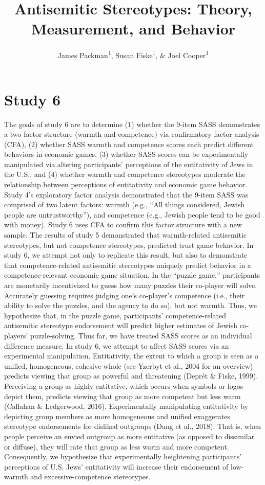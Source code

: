 \documentclass[
  doc,draftall]{apa6}
\title{Antisemitic Stereotypes: Theory, Measurement, and Behavior}
\author{James Packman\textsuperscript{1}, Susan Fiske\textsuperscript{1}, \& Joel Cooper\textsuperscript{1}}
\date{}
\affiliation{\vspace{0.5cm}\textsuperscript{1} Princeton University}
\begin{document}
\maketitle

\section{Study 6}\label{study-6}

The goals of study 6 are to determine (1) whether the 9-item SASS demonstrates a two-factor structure (warmth and competence) via confirmatory factor analysis (CFA), (2) whether SASS warmth and competence scores each predict different behaviors in economic games, (3) whether SASS scores can be experimentally manipulated via altering participants' perceptions of the entitativity of Jews in the U.S., and (4) whether warmth and competence stereotypes moderate the relationship between perceptions of entitativity and economic game behavior.
Study 4's exploratory factor analysis demonstrated that the 9-item SASS was comprised of two latent factors: warmth (e.g., ``All things considered, Jewish people are untrustworthy''), and competence (e.g., Jewish people tend to be good with money). Study 6 uses CFA to confirm this factor structure with a new sample.
The results of study 5 demonstrated that warmth-related antisemitic stereotypes, but not competence stereotypes, predicted trust game behavior. In study 6, we attempt not only to replicate this result, but also to demonstrate that competence-related antisemitic stereotypes uniquely predict behavior in a competence-relevant economic game situation. In the ``puzzle game,'' participants are monetarily incentivized to guess how many puzzles their co-player will solve. Accurately guessing requires judging one's co-player's competence (i.e., their ability to solve the puzzles, and the agency to do so), but not warmth. Thus, we hypothesize that, in the puzzle game, participants' competence-related antisemitic stereotype endorsement will predict higher estimates of Jewish co-players' puzzle-solving.
Thus far, we have treated SASS scores as an individual difference measure. In study 6, we attempt to affect SASS scores via an experimental manipulation. Entitativity, the extent to which a group is seen as a unified, homogeneous, cohesive whole (see Yzerbyt et al., 2004 for an overview) predicts viewing that group as powerful and threatening (Deprét \& Fiske, 1999). Perceiving a group as highly entitative, which occurs when symbols or logos depict them, predicts viewing that group as more competent but less warm (Callahan \& Ledgerwood, 2016). Experimentally manipulating entitativity by depicting group members as more homogeneous and unified exaggerates stereotype endorsements for disliked outgroups (Dang et al., 2018). That is, when people perceive an envied outgroup as more entitative (as opposed to dissimilar or diffuse), they will rate that group as less warm and more competent. Consequently, we hypothesize that experimentally heightening participants' perceptions of U.S. Jews' entitativity will increase their endorsement of low-warmth and excessive-competence stereotypes.
\end{document}
